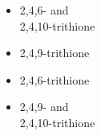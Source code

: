 \documentclass[25pt, portrait]{tikzposter}
\begin{document}
\begin{columns}
{\begin{minipage}[t]{0.595\colwidth}
{\begin{adjustbox}{valign=t}
\begin{minipage}[t]{24.6cm}
\begin{center}
\begin{itemize}
\begin{itemize}
				\end{itemize}
		\end{itemize}
		\vspace{0.3cm}
     \end{center}
      \begin{minipage}[t]{7.9cm}
\begin{itemize}
	\item 2,4,6- and \\2,4,10-trithione
  \vspace{0.3cm}
	\item 2,4,9-trithione
  \vspace{2.8cm}
	\item 2,4,6-trithione
	\item 2,4,9- and \\2,4,10-trithione
\end{itemize}

				

\end{minipage}
\end{minipage}
\end{adjustbox}}
\end{minipage}}
\end{columns}
\end{document}
